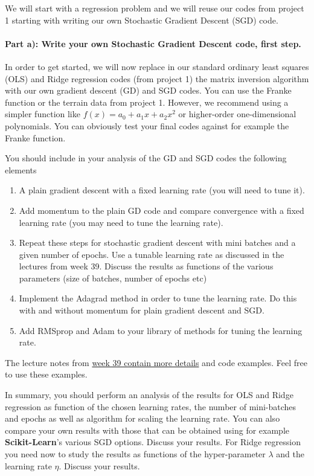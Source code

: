 \documentclass[%
oneside,                 %
final,                   %
10pt]{article}
\begin{document}
We will start with a regression problem and we will reuse our codes from project 1 starting with writing our own Stochastic Gradient Descent (SGD) code. 

\paragraph{Part a): Write your own Stochastic Gradient Descent  code, first step.}
In order to get started, we will now replace in our standard ordinary
least squares (OLS) and Ridge regression codes (from project 1) the
matrix inversion algorithm with our own gradient descent (GD) and SGD
codes.  You can use the Franke function or the terrain data from
project 1. However, we recommend using a simpler function like
$f(x)=a_0+a_1x+a_2x^2$ or higher-order one-dimensional polynomials.
You can obviously test your final codes against for example the Franke
function.

You should include in your analysis of the GD and SGD codes the following elements
\begin{enumerate}
\item A plain gradient descent with a fixed learning rate (you will need to tune it).

\item Add momentum to the plain GD code and compare convergence with a fixed learning rate (you may need to tune the learning rate).

\item Repeat these steps for stochastic gradient descent with mini batches and a given number of epochs. Use a tunable learning rate as discussed in the lectures from week 39. Discuss the results as functions of the various parameters (size of batches, number of epochs etc)

\item Implement the Adagrad method in order to tune the learning rate. Do this with and without momentum for plain gradient descent and SGD.

\item Add RMSprop and Adam to your library of methods for tuning the learning rate.
\end{enumerate}

\noindent
The lecture notes from \href{{https://compphysics.github.io/MachineLearning/doc/pub/week39/html/week39.html}}{week 39 contain more
details} and code examples. Feel free to use these examples.

In summary, you should 
perform an analysis of the results for OLS and Ridge regression as
function of the chosen learning rates, the number of mini-batches and
epochs as well as algorithm for scaling the learning rate. You can
also compare your own results with those that can be obtained using
for example \textbf{Scikit-Learn}'s various SGD options.  Discuss your
results. For Ridge regression you need now to study the results as functions of  the hyper-parameter $\lambda$ and 
the learning rate $\eta$.  Discuss your results.
\end{document}
